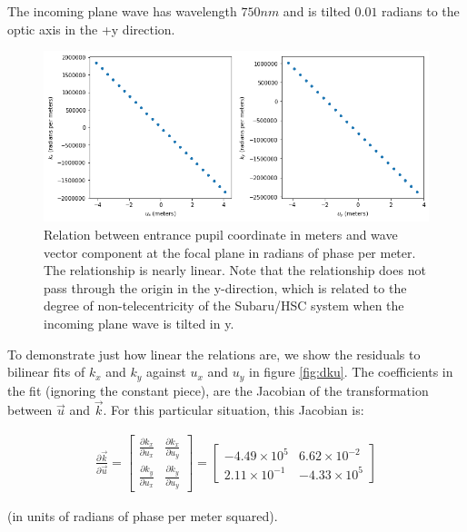 \documentclass{article}
\begin{document}
The incoming plane wave has wavelength $750 nm$ and is tilted $0.01$ radians to the optic axis in
the +y direction.

\begin{figure}
    \includegraphics[scale=0.7]{ku.png}

    \caption{Relation between entrance pupil coordinate in meters and wave vector component at the
    focal plane in radians of phase per meter. The relationship is nearly linear.  Note that the
    relationship does not pass through the origin in the y-direction, which is related to the degree
    of non-telecentricity of the Subaru/HSC system when the incoming plane wave is tilted in y.}

    \label{fig:ku}
\end{figure}

To demonstrate just how linear the relations are, we show the residuals to bilinear fits of $k_x$
and $k_y$ against $u_x$ and $u_y$ in figure \ref{fig:dku}.  The coefficients in the fit (ignoring
the constant piece), are the Jacobian of the transformation between $\vec{u}$ and $\vec{k}$.  For
this particular situation, this Jacobian is:


\begin{gather}
 \frac{\partial \vec{k}}{\partial \vec{u}}
 =
  \begin{bmatrix} \frac{\partial k_x}{\partial u_x} & \frac{\partial k_x}{\partial u_y} \\
                  \frac{\partial k_y}{\partial u_x} & \frac{\partial k_y}{\partial u_y} \end{bmatrix}
 =
  \begin{bmatrix}
   -4.49 \times 10^5 & 6.62 \times 10^{-2} \\
   2.11 \times 10^{-1} & -4.33 \times 10^5
   \end{bmatrix}
\end{gather}

(in units of radians of phase per meter squared).
\end{document}
